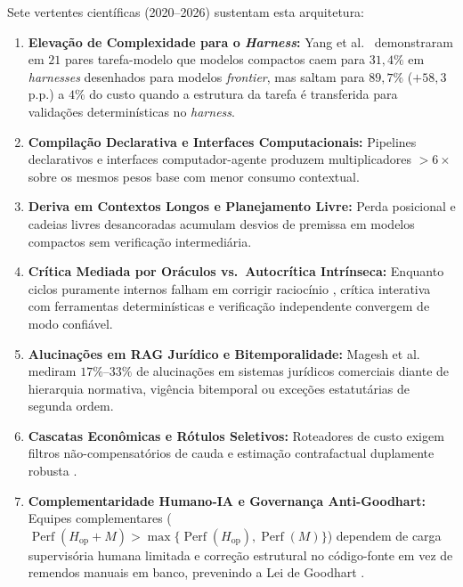 \documentclass[10pt,twocolumn]{article}
\begin{document}
Sete vertentes cient\'ificas (2020--2026) sustentam esta arquitetura:
\begin{enumerate}[leftmargin=*,nosep]
  \item \textbf{Eleva\c{c}\~ao de Complexidade para o \emph{Harness}:} Yang et al.\ \cite{yang2026better} demonstraram em $21$ pares tarefa-modelo que modelos compactos caem para $31,4\%$ em \emph{harnesses} desenhados para modelos \emph{frontier}, mas saltam para $89,7\%$ ($+58,3$ p.p.) a $4\%$ do custo quando a estrutura da tarefa \'e transferida para valida\c{c}\~oes determin\'isticas no \emph{harness}.
  \item \textbf{Compila\c{c}\~ao Declarativa e Interfaces Computacionais:} Pipelines declarativos \cite{khattab2024dspy} e interfaces computador-agente \cite{jimenez2024swebench,yang2024sweagent} produzem multiplicadores $>6\times$ sobre os mesmos pesos base com menor consumo contextual.
  \item \textbf{Deriva em Contextos Longos e Planejamento Livre:} Perda posicional \cite{liu2024lost} e cadeias livres desancoradas acumulam desvios de premissa em modelos compactos sem verifica\c{c}\~ao intermedi\'aria.
  \item \textbf{Cr\'itica Mediada por Or\'aculos vs.\ Autocr\'itica Intr\'inseca:} Enquanto ciclos puramente internos falham em corrigir racioc\'inio \cite{huang2024large}, cr\'itica interativa com ferramentas determin\'isticas \cite{gou2024critic} e verifica\c{c}\~ao independente \cite{du2024improving} convergem de modo confi\'avel.
  \item \textbf{Alucina\c{c}\~oes em RAG Jur\'idico e Bitemporalidade:} Magesh et al.\ \cite{magesh2025hallucination} mediram $17\%$--$33\%$ de alucina\c{c}\~oes em sistemas jur\'idicos comerciais diante de hierarquia normativa, vig\^encia bitemporal \cite{jensen1999temporal,kulkarni2012temporal} ou exce\c{c}\~oes estatut\'arias de segunda ordem.
  \item \textbf{Cascatas Econ\^omicas e R\'otulos Seletivos:} Roteadores de custo \cite{chen2023frugalgpt,ong2025routellm} exigem filtros n\~ao-compensat\'orios de cauda e estima\c{c}\~ao contrafactual duplamente robusta \cite{lakkaraju2017selective,robins1994estimation}.
  \item \textbf{Complementaridade Humano-IA e Governan\c{c}a Anti-Goodhart:} Equipes complementares ($\operatorname{Perf}(H_{\mathrm{op}}+M) > \max\{\operatorname{Perf}(H_{\mathrm{op}}),\operatorname{Perf}(M)\}$) dependem de carga supervis\'oria humana limitada \cite{parasuraman2000model,amershi2019guidelines,wilder2020learning,bansal2021does} e corre\c{c}\~ao estrutural no c\'odigo-fonte em vez de remendos manuais em banco, prevenindo a Lei de Goodhart \cite{goodhart1975problems,strathern1997improving}.
\end{enumerate}
\end{document}
